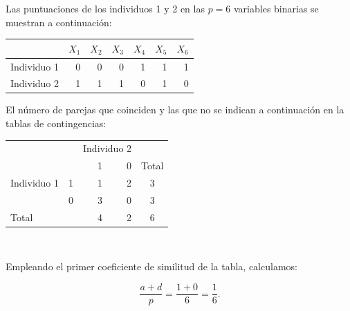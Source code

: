 \documentclass[spanish]{beamer}
\begin{document}
\begin{frame}{}
Las puntuaciones de los individuos 1 y 2 en las $p=6$ variables binarias se muestran a continuación:\break

\begin{table}[h]
  \centering
\resizebox{8cm}{!} {
  \begin{tabular}{lrrrrrr}
    \toprule
            & \multicolumn{1}{l}{$X_1$} & \multicolumn{1}{l}{$X_2$} & \multicolumn{1}{l}{$X_3$} & \multicolumn{1}{l}{$X_4$} & \multicolumn{1}{l}{$X_5$} & \multicolumn{1}{l}{$X_6$} \\ \midrule
Individuo 1 & 0                        & 0                        & 0                        & 1                        & 1                        & 1                        \\
Individuo 2 & 1                        & 1                        & 1                        & 0                        & 1                        & 0\\
\bottomrule
\end{tabular}
}
\end{table}
\end{frame}

\begin{frame}
El número de parejas que coinciden y las que no se indican a continuación en la tablas de contingencias:
\begin{table}[h]
  \centering
  \label{tab:contingencias-ej}
\resizebox{6.5cm}{!} {
  \begin{tabular}{lrrrrr}
\multicolumn{2}{l}{\multirow{}{}{}} & \multicolumn{2}{c}{Individuo 2} & \\\cmidrule{3-4}
\multicolumn{2}{l}{}                  & 1        &   0       & \multicolumn{2}{c}{Total}                        \\ \midrule
Individuo 1      & 1      & 1        &  2       & \multicolumn{2}{c}{3}                     \\
                              & 0      & 3        &    0       & \multicolumn{2}{c}{3}                     \\ \midrule
\multicolumn{2}{l}{Total}            & 4     & 2     & \multicolumn{2}{c}{6}\\
\bottomrule
\end{tabular}
}
\end{table}\

Empleando el primer coeficiente de similitud de la tabla, calculamos:

$$\frac{a+d}{p}=\frac{1+0}{6}=\frac{1}{6}. $$
\end{frame}
\end{document}
